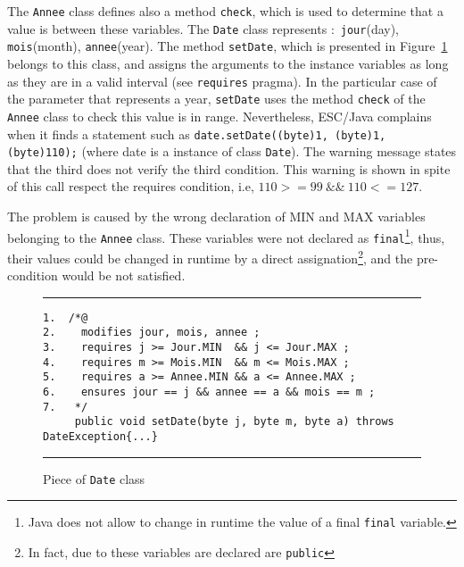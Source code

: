 \documentclass[a4paper]{llncs}
\begin{document}
The \texttt{Annee} class defines also a method \texttt{check}, which is
used to determine that a value is between these variables. The
\texttt{Date} class
represents $:$ \texttt{jour}(day),
\texttt{mois}(month), \texttt{annee}(year). The method
\texttt{setDate}, which is presented in Figure~\ref{fig-cla-dat}
belongs to this class, and assigns the arguments to the
instance variables as long as they are in a valid interval (see
\texttt{requires} pragma). In the particular case of the parameter
that represents a year, \texttt{setDate} uses the
method \texttt{check} of the \texttt{Annee} class to check this
value is in range. Nevertheless, ESC/Java complains when it
finds a statement such as
\mbox{\tt date.setDate((byte)1, (byte)1, (byte)110);} (where date is a
instance of class \texttt{Date}). The warning message states that the
third does not verify the third condition. This warning is shown in
spite of this call respect the
requires condition, i.e, $110>=99\ \&\&\ 110<= 127$.

The problem is caused by the wrong declaration of \textsc{MIN}
and \textsc{MAX} variables belonging to the \texttt{Annee}
class. These variables were not declared as
\texttt{final}\footnote{Java does not allow to change in runtime the
value of a final {\tt final} variable.}, thus, their values could be
changed in runtime by
a direct assignation\footnote{In fact, due to these variables
are declared are \texttt{public}}, and the pre-condition would be not
satisfied. 



\begin{center}
\begin{figure}[hbt]
\rule{\linewidth}{0.3mm}
\begin{verbatim}
1.  /*@
2.    modifies jour, mois, annee ;
3.    requires j >= Jour.MIN  && j <= Jour.MAX ;
4.    requires m >= Mois.MIN  && m <= Mois.MAX ;
5.    requires a >= Annee.MIN && a <= Annee.MAX ;
6.    ensures jour == j && annee == a && mois == m ;
7.   */
     public void setDate(byte j, byte m, byte a) throws DateException{...} 
\end{verbatim}
\caption{Piece of {\tt Date} class}
\label{fig-cla-dat}
\rule{\linewidth}{0.3mm}
\end{figure}
\end{center}
\end{document}
